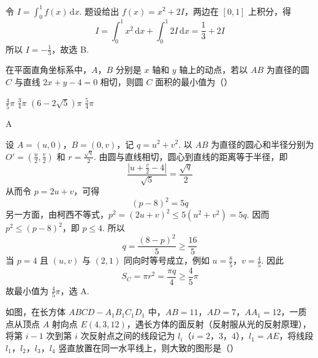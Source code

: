 \begin{solution}
令 \(I=\int_0^1f(x)\,\mathrm{d}x\). 题设给出 \(f(x)=x^2+2I\)，两边在 \([0,1]\) 上积分，得
\[
I=\int_0^1x^2\,\mathrm{d}x+\int_0^1 2I\,\mathrm{d}x=\frac13+2I
\]
所以 \(I=-\frac13\)，故选 B.
\end{solution}

\begin{problem}
在平面直角坐标系中，\(A\)，\(B\) 分别是 \(x\) 轴和 \(y\) 轴上的动点，若以 \(AB\) 为直径的圆 \(C\) 与直线 \(2x + y - 4 = 0\) 相切，则圆 \(C\) 面积的最小值为（\quad）

\choices
    {\(\frac{4}{5}\pi\)}
    {\(\frac{3}{4}\pi\)}
    {\((6 - 2\sqrt{5})\pi\)}
    {\( \frac{5}{4}\pi \)}
\end{problem}

\begin{answer}
A
\end{answer}

\begin{solution}
设 \(A=(u,0)\)，\(B=(0,v)\)，记 \(q=u^2+v^2\). 以 \(AB\) 为直径的圆心和半径分别为 \(O'=(\frac u2,\frac v2)\) 和 \(r=\frac{\sqrt q}{2}\). 由圆与直线相切，圆心到直线的距离等于半径，即
\[
\frac{|u+\frac v2-4|}{\sqrt5}=\frac{\sqrt q}{2}
\]
从而令 \(p=2u+v\)，可得
\[
(p-8)^2=5q
\]
另一方面，由柯西不等式，\(p^2=(2u+v)^2\leqslant5(u^2+v^2)=5q\). 因而 \(p^2\leqslant(p-8)^2\)，即 \(p\leqslant4\). 所以
\[
q=\frac{(8-p)^2}{5}\geqslant\frac{16}{5}
\]
当 \(p=4\) 且 \((u,v)\) 与 \((2,1)\) 同向时等号成立，例如 \(u=\frac85\)，\(v=\frac45\). 因此
\[
S_C=\pi r^2=\frac{\pi q}{4}\geqslant\frac45\pi
\]
故最小值为 \(\frac45\pi\)，选 A.
\end{solution}

\begin{problem}
如图，在长方体 \(ABCD - A_{1}B_{1}C_{1}D_{1}\) 中，\(AB = 11\)，\(AD = 7\)，\(AA_{1} = 12\)，一质点从顶点 \(A\) 射向点 \(E(4,3,12)\)，遇长方体的面反射（反射服从光的反射原理），将第 \(i - 1\) 次到第 \(i\) 次反射点之间的线段记为 \(l_{i}\)（\(i = 2\)，\(3\)，\(4\)），\(l_{1} = AE\)，将线段 \(l_{1}\)，\(l_{2}\)，\(l_{3}\)，\(l_{4}\) 竖直放置在同一水平线上，则大致的图形是（\quad）


    {}
    {}
    {}
\end{problem}

